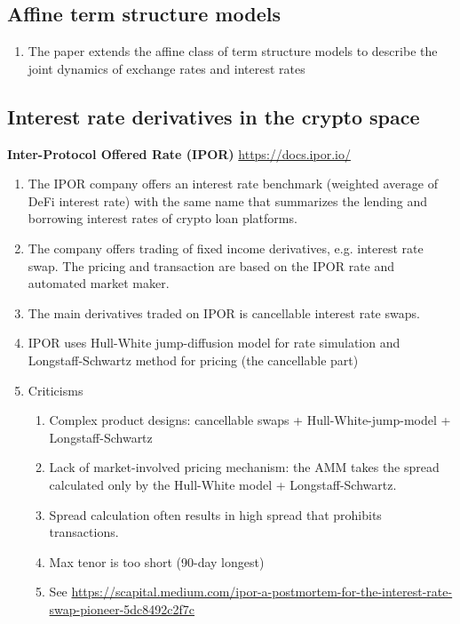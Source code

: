 \documentclass[square]{article} %
\theoremstyle{plain}
\theoremstyle{definition} %
\begin{document}
\subsection{Affine term structure models}
\cite{anderson2010affine}
\begin{enumerate}
  \item The paper extends the affine class of term structure models to describe the joint dynamics of exchange rates and interest rates
\end{enumerate}

\subsection{Interest rate derivatives in the crypto space}
{\bf Inter-Protocol Offered Rate (IPOR)} \url{https://docs.ipor.io/}
\begin{enumerate}
  \item The IPOR company offers an interest rate benchmark (weighted average of DeFi interest rate) with the same name that 
  summarizes the lending and borrowing interest rates of crypto loan platforms.
  \item The company offers trading of fixed income derivatives, e.g. interest rate swap. 
  The pricing and transaction are based on the IPOR rate and automated market maker. 
  \item The main derivatives traded on IPOR is cancellable interest rate swaps.
  \item IPOR uses Hull-White jump-diffusion model for rate simulation and Longstaff-Schwartz method for pricing (the cancellable part)
  \item Criticisms
  \begin{enumerate}
    \item Complex product designs: cancellable swaps + Hull-White-jump-model + Longstaff-Schwartz 
    \item Lack of market-involved pricing mechanism: the AMM takes the spread calculated only by the Hull-White model + Longstaff-Schwartz. 
    \item Spread calculation often results in high spread that prohibits transactions. 
    \item Max tenor is too short (90-day longest) 
    \item See \url{https://scapital.medium.com/ipor-a-postmortem-for-the-interest-rate-swap-pioneer-5dc8492c2f7c}
  \end{enumerate}
\end{enumerate}
\end{document}
